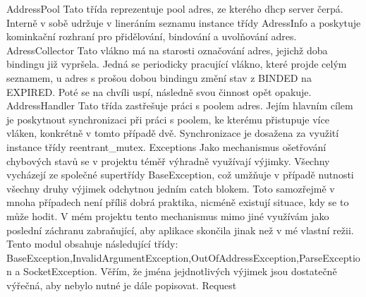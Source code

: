 \documentclass[12pt,a4paper]{report}
\begin{document}
AddressPool
	Tato třída reprezentuje pool adres, ze kterého dhcp server čerpá. Interně v sobě udržuje v lineráním seznamu instance třídy AdressInfo a poskytuje kominkační rozhraní pro přidělování, bindování a uvolňování adres.
AdressCollector
	Tato vlákno má na starosti označování adres, jejichž doba bindingu již vypršela. Jedná se periodicky pracující vlákno, které projde celým seznamem, u adres s prošou dobou bindingu změní stav z BINDED na EXPIRED. Poté se na chvíli uspí, následně svou činnost opět opakuje. 
AddressHandler
	Tato třída zastřešuje práci s poolem adres. Jejím hlavním cílem je poskytnout synchronizaci při práci s poolem, ke kterému přistupuje více vláken, konkrétně v tomto případě dvě. Synchronizace je dosažena za využití instance třídy reentrant\_mutex. 
Exceptions
Jako mechanismus ošetřování chybových stavů se v projektu téměř výhradně využívají výjimky. Všechny vycházejí ze společné supertřídy BaseException, což umžňuje v případě nutnosti všechny druhy výjimek odchytnou jedním catch blokem. Toto samozřejmě v mnoha případech není příliš dobrá praktika, nicméně existují situace, kdy se to může hodit. V mém projektu tento mechanismus mimo jiné využívám jako poslední záchranu zabraňující, aby aplikace skončila jinak než v mé vlastní režii. 
Tento modul obsahuje následující třídy: BaseException,InvalidArgumentException,OutOfAddressException,ParseException a SocketException.
Věřím, že jména jejdnotlivých výjimek jsou dostatečně výřečná, aby nebylo nutné je dále popisovat. 
Request
\end{document}
